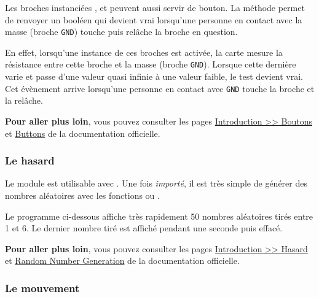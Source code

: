 \begin{remarque}
    Les broches instanciées ,  et  peuvent aussi servir de bouton. La méthode  permet de renvoyer un booléen qui devient vrai lorsqu'une personne en contact avec la masse (broche \texttt{GND}) touche puis relâche la broche en question.
    
    En effet, lorsqu'une instance de ces broches est activée, la carte \mb mesure la résistance entre cette broche et la masse (broche \texttt{GND}). Lorsque cette dernière varie et passe d'une valeur quasi infinie à une valeur faible, le test devient vrai. Cet évènement arrive lorsqu'une personne en contact avec \texttt{GND} touche la broche et la relâche.
\end{remarque}

\begin{remarque}
\textbf{Pour aller plus loin}, vous pouvez consulter les pages  \href{https://microbit-micropython.readthedocs.io/fr/latest/tutorials/buttons.html}{Introduction >> Boutons} et \href{https://microbit-micropython.readthedocs.io/fr/latest/button.html}{Buttons} de la documentation officielle.
\end{remarque}


\subsubsection{Le hasard}

Le module  est utilisable avec \mb. Une fois \emph{importé}, il est très simple de générer des nombres aléatoires avec les fonctions  ou .

\begin{methode}
Le programme ci-dessous affiche très rapidement 50 nombres aléatoires tirés entre 1 et 6. Le dernier nombre tiré est affiché pendant une seconde puis effacé.
\end{methode}

\begin{remarque}
\textbf{Pour aller plus loin}, vous pouvez consulter les pages  \href{https://microbit-micropython.readthedocs.io/fr/latest/tutorials/random.html}{Introduction >> Hasard} et \href{https://microbit-micropython.readthedocs.io/fr/latest/random.html}{Random Number Generation} de la documentation officielle.
\end{remarque}


\subsubsection{Le mouvement}

